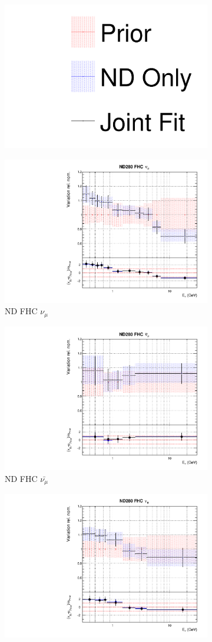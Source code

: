 \begin{figure}[!htbp]
\centering
\begin{subfigure}{0.8\textwidth}
  \centering
  \includegraphics[width=0.24\linewidth]{figs/joint_leg}
\end{subfigure}
\begin{subfigure}{0.45\textwidth}
  \centering
  \includegraphics[width=0.75\linewidth]{figs/jointflux0}
  \caption{ND FHC $\nu_{\mu}$}
\end{subfigure}
\begin{subfigure}{0.45\textwidth}
  \centering
  \includegraphics[width=0.75\linewidth]{figs/jointflux1}
  \caption{ND FHC $\bar{\nu_{\mu}}$}
\end{subfigure}
\begin{subfigure}{0.45\textwidth}
  \centering
  \includegraphics[width=0.75\linewidth]{figs/jointflux2}

\end{subfigure}
\end{figure}
